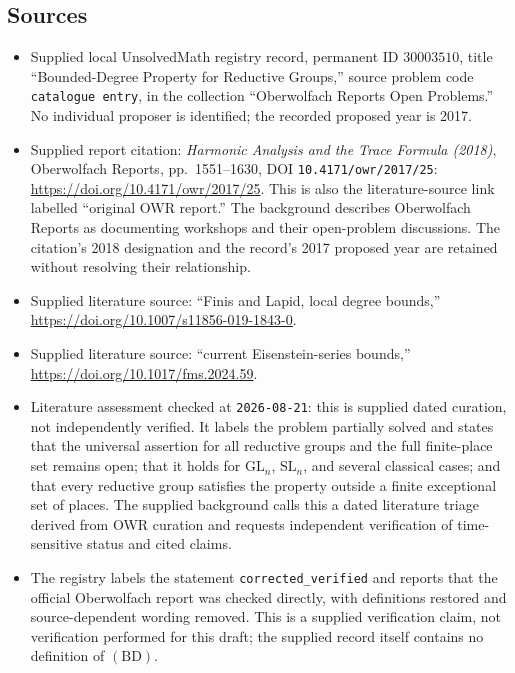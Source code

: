 \documentclass[11pt]{article}
\begin{document}
\subsection{Sources}
\begin{itemize}
\item Supplied local UnsolvedMath registry record, permanent ID \(30003510\), title ``Bounded-Degree Property for Reductive Groups,'' source problem code \texttt{catalogue entry}, in the collection ``Oberwolfach Reports Open Problems.'' No individual proposer is identified; the recorded proposed year is 2017.
\item Supplied report citation: \emph{Harmonic Analysis and the Trace Formula (2018)}, Oberwolfach Reports, pp.~1551--1630, DOI \texttt{10.4171/owr/2017/25}: \url{https://doi.org/10.4171/owr/2017/25}. This is also the literature-source link labelled ``original OWR report.'' The background describes Oberwolfach Reports as documenting workshops and their open-problem discussions. The citation's 2018 designation and the record's 2017 proposed year are retained without resolving their relationship.
\item Supplied literature source: ``Finis and Lapid, local degree bounds,'' \url{https://doi.org/10.1007/s11856-019-1843-0}.
\item Supplied literature source: ``current Eisenstein-series bounds,'' \url{https://doi.org/10.1017/fms.2024.59}.
\item Literature assessment checked at \texttt{2026-08-21}: this is supplied dated curation, not independently verified. It labels the problem partially solved and states that the universal assertion for all reductive groups and the full finite-place set remains open; that it holds for \(\mathrm{GL}_n\), \(\mathrm{SL}_n\), and several classical cases; and that every reductive group satisfies the property outside a finite exceptional set of places. The supplied background calls this a dated literature triage derived from OWR curation and requests independent verification of time-sensitive status and cited claims.
\item The registry labels the statement \texttt{corrected\_verified} and reports that the official Oberwolfach report was checked directly, with definitions restored and source-dependent wording removed. This is a supplied verification claim, not verification performed for this draft; the supplied record itself contains no definition of \((\mathrm{BD})\).
\end{itemize}
\end{document}
